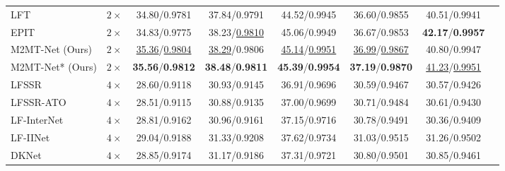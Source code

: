 \begin{table*}[t!]
\begin{tabular}{|l|c|c|c|c|c|c|c|}
    LFT \cite{liangLFT_SPL2022}	                & $2\times$ & 34.80/0.9781                          & 37.84/0.9791                          & 44.52/0.9945                              & 36.60/0.9855                            &	40.51/0.9941                            \\
    EPIT \cite{liangEPIT_arXiv2023}	            & $2\times$ & 34.83/0.9775                          & 38.23/\underline{0.9810}              & 45.06/0.9949                              & 36.67/0.9853                            &	\textbf{42.17}/\textbf{0.9957}          \\
    \hline
    M2MT-Net (Ours)                   & $2\times$ & \underline{35.36}/\underline{0.9804}  & \underline{38.29}/0.9806              & \underline{45.14}/\underline{0.9951}      & \underline{36.99}/\underline{0.9867}    & 40.80/0.9947                            \\
    M2MT-Net* (Ours)                  & $2\times$ & \textbf{35.56}/\textbf{0.9812}        & \textbf{38.48}/\textbf{0.9811}        & \textbf{45.39}/\textbf{0.9954}            & \textbf{37.19}/\textbf{0.9870}          & \underline{41.23}/\underline{0.9951}    \\
    \hline\hline    
    LFSSR \cite{yeungSAS_LFSR2019}              & $4\times$ & 28.60/0.9118                          & 30.93/0.9145                          & 36.91/0.9696                              & 30.59/0.9467                              & 30.57/0.9426 \\
    LFSSR-ATO \cite{jinLFSSRATO_2020}           & $4\times$ & 28.51/0.9115                          & 30.88/0.9135                          & 37.00/0.9699                              & 30.71/0.9484                              & 30.61/0.9430 \\
    LF-InterNet \cite{wangLfInterNet_ECCV2020}  & $4\times$ & 28.81/0.9162                          & 30.96/0.9161                          & 37.15/0.9716                              & 30.78/0.9491                              & 30.36/0.9409 \\
    LF-IINet \cite{liuLFIINet_TMM2021}          & $4\times$ & 29.04/0.9188                          & 31.33/0.9208                          & 37.62/0.9734                              & 31.03/0.9515                              & 31.26/0.9502 \\
    DKNet \cite{huDKNet_TIM2022}                & $4\times$ & 28.85/0.9174                          & 31.17/0.9186                          & 37.31/0.9721                              & 30.80/0.9501                              & 30.85/0.9461 \\

\end{tabular}
\end{table*}
